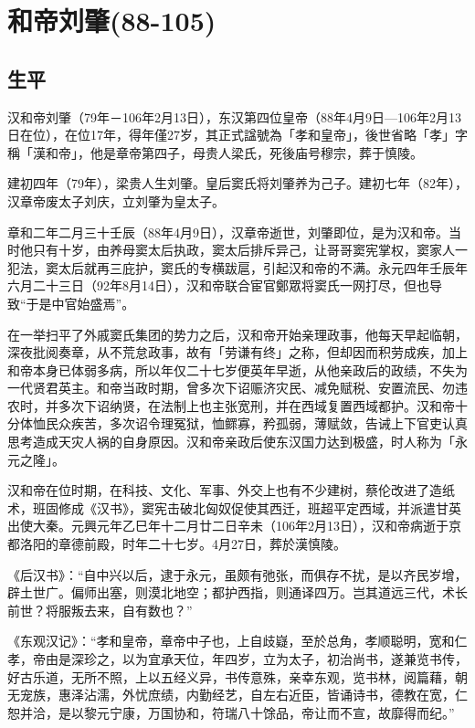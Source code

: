 
\section{和帝刘肇\tiny(88-105)}

\subsection{生平}

汉和帝刘肇（79年－106年2月13日），东汉第四位皇帝（88年4月9日—106年2月13日在位），在位17年，得年僅27岁，其正式諡號為「孝和皇帝」，後世省略「孝」字稱「漢和帝」，他是章帝第四子，母贵人梁氏，死後庙号穆宗，葬于慎陵。

建初四年（79年），梁贵人生刘肇。皇后窦氏将刘肇养为己子。建初七年（82年），汉章帝废太子刘庆，立刘肇为皇太子。

章和二年二月三十壬辰（88年4月9日），汉章帝逝世，刘肇即位，是为汉和帝。当时他只有十岁，由养母窦太后执政，窦太后排斥异己，让哥哥窦宪掌权，窦家人一犯法，窦太后就再三庇护，窦氏的专横跋扈，引起汉和帝的不满。永元四年壬辰年六月二十三日（92年8月14日），汉和帝联合宦官鄭眾将窦氏一网打尽，但也导致“于是中官始盛焉”。

在一举扫平了外戚窦氏集团的势力之后，汉和帝开始亲理政事，他每天早起临朝，深夜批阅奏章，从不荒怠政事，故有「劳谦有终」之称，但却因而积劳成疾，加上和帝本身已体弱多病，所以年仅二十七岁便英年早逝，从他亲政后的政绩，不失为一代贤君英主。和帝当政时期，曾多次下诏赈济灾民、减免赋税、安置流民、勿违农时，并多次下诏纳贤，在法制上也主张宽刑，并在西域复置西域都护。汉和帝十分体恤民众疾苦，多次诏令理冤狱，恤鳏寡，矜孤弱，薄赋敛，告诫上下官吏认真思考造成天灾人祸的自身原因。汉和帝亲政后使东汉国力达到极盛，时人称为「永元之隆」。

汉和帝在位时期，在科技、文化、军事、外交上也有不少建树，蔡伦改进了造纸术，班固修成《汉书》，窦宪击破北匈奴促使其西迁，班超平定西域，并派遣甘英出使大秦。元興元年乙巳年十二月廿二日辛未（106年2月13日），汉和帝病逝于京都洛阳的章德前殿，时年二十七岁。4月27日，葬於漢慎陵。

《后汉书》：“自中兴以后，逮于永元，虽颇有弛张，而俱存不扰，是以齐民岁增，辟土世广。偏师出塞，则漠北地空；都护西指，则通译四万。岂其道远三代，术长前世？将服叛去来，自有数也？”

《东观汉记》：“孝和皇帝，章帝中子也，上自歧嶷，至於总角，孝顺聪明，宽和仁孝，帝由是深珍之，以为宜承天位，年四岁，立为太子，初治尚书，遂兼览书传，好古乐道，无所不照，上以五经义异，书传意殊，亲幸东观，览书林，阅篇藉，朝无宠族，惠泽沾濡，外忧庶绩，内勤经艺，自左右近臣，皆诵诗书，德教在宽，仁恕并洽，是以黎元宁康，万国协和，符瑞八十馀品，帝让而不宣，故靡得而纪。”

